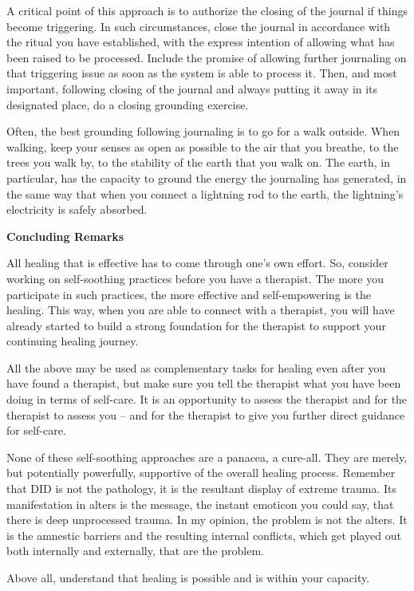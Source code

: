\documentclass[]{book}
\begin{document}
A critical point of this approach is to authorize the closing of the journal if things become triggering. In such circumstances, close the journal in accordance with the ritual you have established, with the express intention of allowing what has been raised to be processed. Include the promise of allowing further journaling on that triggering issue as soon as the system is able to process it. Then, and most important, following closing of the journal and always putting it away in its designated place, do a closing grounding exercise.

Often, the best grounding following journaling is to go for a walk outside. When walking, keep your senses as open as possible to the air that you breathe, to the trees you walk by, to the stability of the earth that you walk on. The earth, in particular, has the capacity to ground the energy the journaling has generated, in the same way that when you connect a lightning rod to the earth, the lightning's electricity is safely absorbed.

\textbf{Concluding Remarks}

All healing that is effective has to come through one's own effort. So, consider working on self-soothing practices before you have a therapist. The more you participate in such practices, the more effective and self-empowering is the healing. This way, when you are able to connect with a therapist, you will have already started to build a strong foundation for the therapist to support your continuing healing journey.

All the above may be used as complementary tasks for healing even after you have found a therapist, but make sure you tell the therapist what you have been doing in terms of self-care. It is an opportunity to assess the therapist and for the therapist to assess you -- and for the therapist to give you further direct guidance for self-care.

None of these self-soothing approaches are a panacea, a cure-all. They are merely, but potentially powerfully, supportive of the overall healing process. Remember that DID is not the pathology, it is the resultant display of extreme trauma. Its manifestation in alters is the message, the instant emoticon you could say, that there is deep unprocessed trauma. In my opinion, the problem is not the alters. It is the amnestic barriers and the resulting internal conflicts, which get played out both internally and externally, that are the problem.

Above all, understand that healing is possible and is within your capacity.
\end{document}
